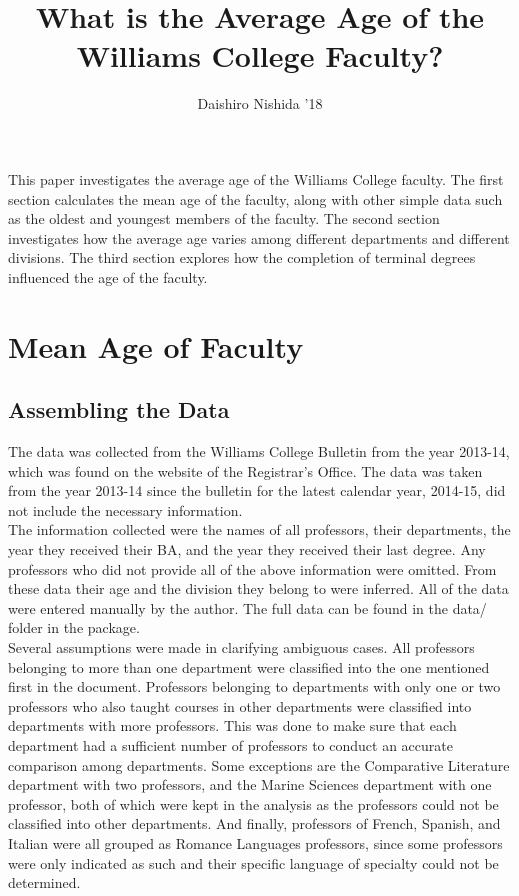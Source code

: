 \documentclass{article}\usepackage[]{graphicx}\usepackage[]{color}
\begin{document}
\title{What is the Average Age of the Williams College Faculty?}
\author{Daishiro Nishida '18}
\maketitle

This paper investigates the average age of the Williams College faculty. The first section calculates the
mean age of the faculty, along with other simple data such as the oldest and youngest members of the faculty.
The second section investigates how the average age varies among different departments and different
divisions. The third section explores how the completion of terminal degrees influenced the age of the
faculty.\\

\section{Mean Age of Faculty}

\subsection{Assembling the Data}
The data was collected from the Williams College Bulletin from the year 2013-14, which was found on the
website of the Registrar's Office. The data was taken from the year 2013-14 since the bulletin for the
latest calendar year, 2014-15, did not include the necessary information.\\

The information collected were the names of all professors, their departments, the year they received their
BA, and the year they received their last degree. Any professors who did not provide all of the above
information were omitted. From these data their age and the division they belong to were inferred.
All of the data were entered manually by the author.
The full data can be found in the data/ folder in the package.\\

Several assumptions were made in clarifying ambiguous cases. All professors belonging to more than one
department were classified into the one mentioned first in the document. Professors belonging to departments
with only one or two professors who also taught courses in other departments were classified into departments
with more professors. This was done to make sure that each department had a sufficient number of professors
to conduct an accurate comparison among departments. Some exceptions are the Comparative Literature department
with two professors, and the Marine Sciences department with one professor, both of which were kept in the analysis as the professors could not be classified into other departments. And finally, professors of French,
Spanish, and Italian were all grouped as Romance Languages professors, since some professors were only
indicated as such and their specific language of specialty could not be determined.
\end{document}
